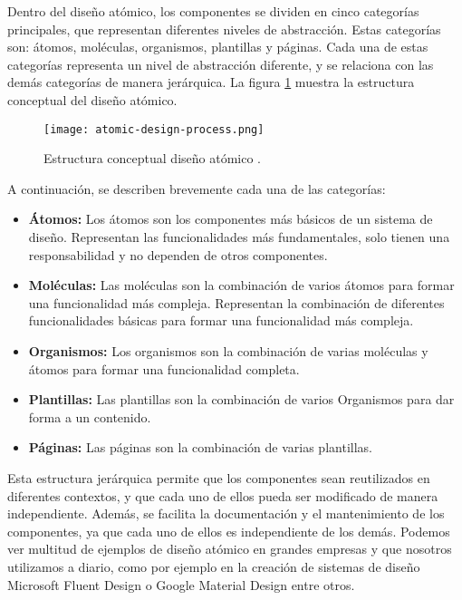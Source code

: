 Dentro del diseño atómico, los componentes se dividen en cinco categorías
principales, que representan diferentes niveles de abstracción. Estas categorías
son: átomos, moléculas, organismos, plantillas y páginas. Cada una de estas
categorías representa un nivel de abstracción diferente, y se relaciona con
las demás categorías de manera jerárquica. La figura \ref{fig:atomic-design}
muestra la estructura conceptual del diseño atómico. 

\begin{figure}[ht]
    \centering
    \texttt{[image: atomic-design-process.png]}
    \caption{Estructura conceptual diseño atómico \cite{frost2016atomic}.}\label{fig:atomic-design}
\end{figure}

A continuación, se describen brevemente cada una de las categorías:
\begin{itemize}
    \item \textbf{Átomos:} Los átomos son los componentes más básicos de un sistema
    de diseño. Representan las funcionalidades más fundamentales, solo tienen
    una responsabilidad y no dependen de otros componentes.
    \item \textbf{Moléculas:} Las moléculas son la combinación de varios átomos
    para formar una funcionalidad más compleja. Representan la combinación de
    diferentes funcionalidades básicas para formar una funcionalidad más compleja.
    \item \textbf{Organismos:} Los organismos son la combinación de varias moléculas
    y átomos para formar una funcionalidad completa.
    \item \textbf{Plantillas:} Las plantillas son la combinación de varios Organismos
    para dar forma a un contenido.
    \item \textbf{Páginas:} Las páginas son la combinación de varias plantillas.
\end{itemize}

Esta estructura jerárquica permite que los componentes sean reutilizados en
diferentes contextos, y que cada uno de ellos pueda ser modificado de manera
independiente. Además, se facilita la documentación y el mantenimiento de los
componentes, ya que cada uno de ellos es independiente de los demás. Podemos
ver multitud de ejemplos de diseño atómico en grandes empresas y que nosotros utilizamos
a diario, como por ejemplo en la creación de sistemas de diseño Microsoft Fluent
Design o Google Material Design entre otros.\medskip

